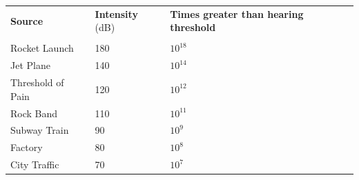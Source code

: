           \begin{table}[H]
        \begin{center}
      \label{m38800*uid12}
    \noindent
      \tablelasttail{}
      \begin{xtabular}[t]{|l|l|l|}\hline
                  \textbf{Source}
                 &
        \textbf{Intensity} (dB) &
                  \textbf{Times greater than hearing threshold}
     \tabularnewline{}
         &
         &
     \tabularnewline{}
        Rocket Launch &
        180 &
                  ${10}^{18}$
     \tabularnewline{}
        Jet Plane &
        140 &
                  ${10}^{14}$
     \tabularnewline{}
        Threshold of Pain &
        120 &
                  ${10}^{12}$
     \tabularnewline{}
        Rock Band &
        110 &
                  ${10}^{11}$
     \tabularnewline{}
        Subway Train &
        90 &
                  ${10}^{9}$
     \tabularnewline{}
        Factory &
        80 &
                  ${10}^{8}$
     \tabularnewline{}
        City Traffic &
        70 &
                  ${10}^{7}$

\end{xtabular}
\end{center}
\end{table}
